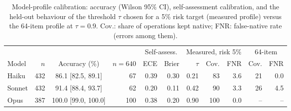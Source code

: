 \begin{table}[t]
\centering
\caption{Model-profile calibration: accuracy (Wilson 95\% CI), self-assessment calibration, and the held-out
behaviour of the threshold $\tau$ chosen for a 5\% risk target (measured profile) versus the 64-item profile at
$\tau=0.9$. Cov.: share of operations kept native; FNR: false-native rate (errors among them).}
\label{tab:ev-calibration}
\scriptsize
\setlength{\tabcolsep}{2.2pt}
\begin{tabular}{@{}lrcrrrrrrrr@{}}
\toprule
 & & & & \multicolumn{2}{c}{Self-assess.} & \multicolumn{3}{c}{Measured, risk 5\%} & \multicolumn{2}{c}{64-item} \\
\cmidrule(lr){5-6}\cmidrule(lr){7-9}\cmidrule(l){10-11}
Model & $n$ & Accuracy (\%) & $n{=}640$ & ECE & Brier & $\tau$ & Cov. & FNR & Cov. & FNR \\
\midrule
Haiku & 432 & 86.1 [82.5, 89.1] & 67 & 0.39 & 0.30 & 0.21 & 83 & 3.6 & 21 & 0.0 \\
Sonnet & 432 & 91.4 [88.4, 93.7] & 62 & 0.20 & 0.11 & 0.42 & 90 & 3.3 & 26 & 4.5 \\
Opus & 387 & 100.0 [99.0, 100.0] & 100 & 0.38 & 0.20 & 0.90 & 100 & 0.0 & -- & -- \\
\bottomrule
\end{tabular}
\end{table}
